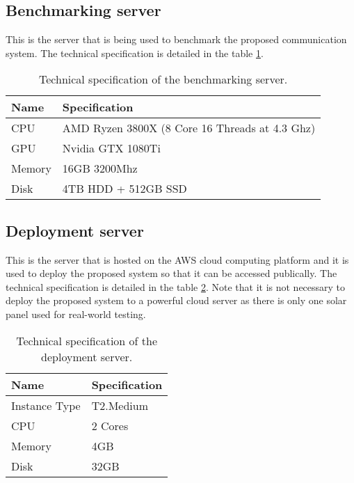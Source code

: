 \documentclass[../thesis.tex]{subfiles}
\begin{document}
\subsection{Benchmarking server}
\label{sec:benchmarkingServer}

This is the server that is being used to benchmark the proposed communication system. The technical specification is detailed in the table \ref{tab:benchmarkingHardware}.

\begin{table}[h!]
\begin{center}
\caption{Technical specification of the benchmarking server.}
\label{tab:benchmarkingHardware}
\begin{tabular}{l|l}
\toprule
\textbf{Name} & \textbf{Specification}\\
\midrule
CPU & AMD Ryzen 3800X (8 Core 16 Threads at 4.3 Ghz)\\
GPU & Nvidia GTX 1080Ti\\
Memory & 16GB 3200Mhz\\
Disk & 4TB HDD + 512GB SSD\\
\bottomrule
\end{tabular}
\end{center}
\end{table}

\subsection{Deployment server}
\label{sec:deploymentServer}

This is the server that is hosted on the AWS cloud computing platform and it is used to deploy the proposed system so that it can be accessed publically. The technical specification is detailed in the table \ref{tab:deploymentHardware}. Note that it is not necessary to deploy the proposed system to a powerful cloud server as there is only one solar panel used for real-world testing.

\begin{table}[h!]
\begin{center}
\caption{Technical specification of the deployment server.}
\label{tab:deploymentHardware}
\begin{tabular}{l|l}
\toprule
\textbf{Name} & \textbf{Specification}\\
\midrule
Instance Type & T2.Medium\\
CPU & 2 Cores\\
Memory & 4GB\\
Disk & 32GB\\
\bottomrule
\end{tabular}
\end{center}
\end{table}
\end{document}
